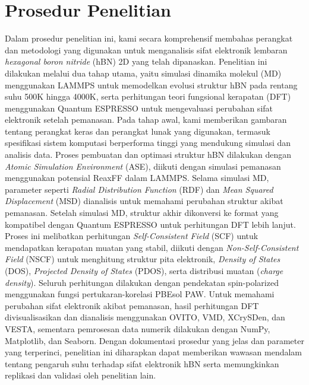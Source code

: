 \section{Prosedur Penelitian}
Dalam prosedur penelitian ini, kami secara komprehensif membahas perangkat dan metodologi yang digunakan untuk menganalisis sifat elektronik lembaran \textit{hexagonal boron nitride} (hBN) 2D yang telah dipanaskan. Penelitian ini dilakukan melalui dua tahap utama, yaitu simulasi dinamika molekul (MD) menggunakan LAMMPS untuk memodelkan evolusi struktur hBN pada rentang suhu 500K hingga 4000K, serta perhitungan teori fungsional kerapatan (DFT) menggunakan Quantum ESPRESSO untuk mengevaluasi perubahan sifat elektronik setelah pemanasan. Pada tahap awal, kami memberikan gambaran tentang perangkat keras dan perangkat lunak yang digunakan, termasuk spesifikasi sistem komputasi berperforma tinggi yang mendukung simulasi dan analisis data. Proses pembuatan dan optimasi struktur hBN dilakukan dengan \textit{Atomic Simulation Environment} (ASE), diikuti dengan simulasi pemanasan menggunakan potensial ReaxFF dalam LAMMPS. Selama simulasi MD, parameter seperti \textit{Radial Distribution Function} (RDF) dan \textit{Mean Squared Displacement} (MSD) dianalisis untuk memahami perubahan struktur akibat pemanasan. Setelah simulasi MD, struktur akhir dikonversi ke format yang kompatibel dengan Quantum ESPRESSO untuk perhitungan DFT lebih lanjut. Proses ini melibatkan perhitungan \textit{Self-Consistent Field} (SCF) untuk mendapatkan kerapatan muatan yang stabil, diikuti dengan \textit{Non-Self-Consistent Field} (NSCF) untuk menghitung struktur pita elektronik, \textit{Density of States} (DOS), \textit{Projected Density of States} (PDOS), serta distribusi muatan (\textit{charge density}). Seluruh perhitungan dilakukan dengan pendekatan spin-polarized menggunakan fungsi pertukaran-korelasi PBEsol PAW. Untuk memahami perubahan sifat elektronik akibat pemanasan, hasil perhitungan DFT divisualisasikan dan dianalisis menggunakan OVITO, VMD, XCrySDen, dan VESTA, sementara pemrosesan data numerik dilakukan dengan NumPy, Matplotlib, dan Seaborn. Dengan dokumentasi prosedur yang jelas dan parameter yang terperinci, penelitian ini diharapkan dapat memberikan wawasan mendalam tentang pengaruh suhu terhadap sifat elektronik hBN serta memungkinkan replikasi dan validasi oleh penelitian lain. \vspace{3mm}

